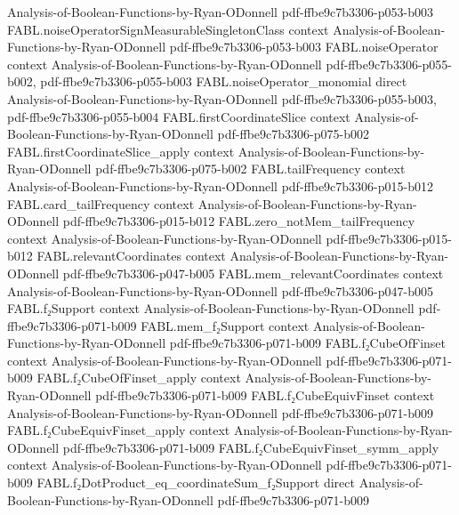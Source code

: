 \begin{theorem}
  {Analysis-of-Boolean-Functions-by-Ryan-ODonnell}
  {pdf-ffbe9c7b3306-p053-b003}
\proofstep
  {FABL.noiseOperatorSignMeasurableSingletonClass}
  {context}
  {Analysis-of-Boolean-Functions-by-Ryan-ODonnell}
  {pdf-ffbe9c7b3306-p053-b003}
\proofstep
  {FABL.noiseOperator}
  {context}
  {Analysis-of-Boolean-Functions-by-Ryan-ODonnell}
  {pdf-ffbe9c7b3306-p055-b002,
    pdf-ffbe9c7b3306-p055-b003}
\proofstep
  {FABL.noiseOperator_monomial}
  {direct}
  {Analysis-of-Boolean-Functions-by-Ryan-ODonnell}
  {pdf-ffbe9c7b3306-p055-b003,
    pdf-ffbe9c7b3306-p055-b004}
\proofstep
  {FABL.firstCoordinateSlice}
  {context}
  {Analysis-of-Boolean-Functions-by-Ryan-ODonnell}
  {pdf-ffbe9c7b3306-p075-b002}
\proofstep
  {FABL.firstCoordinateSlice_apply}
  {context}
  {Analysis-of-Boolean-Functions-by-Ryan-ODonnell}
  {pdf-ffbe9c7b3306-p075-b002}
\proofstep
  {FABL.tailFrequency}
  {context}
  {Analysis-of-Boolean-Functions-by-Ryan-ODonnell}
  {pdf-ffbe9c7b3306-p015-b012}
\proofstep
  {FABL.card_tailFrequency}
  {context}
  {Analysis-of-Boolean-Functions-by-Ryan-ODonnell}
  {pdf-ffbe9c7b3306-p015-b012}
\proofstep
  {FABL.zero_notMem_tailFrequency}
  {context}
  {Analysis-of-Boolean-Functions-by-Ryan-ODonnell}
  {pdf-ffbe9c7b3306-p015-b012}
\proofstep
  {FABL.relevantCoordinates}
  {context}
  {Analysis-of-Boolean-Functions-by-Ryan-ODonnell}
  {pdf-ffbe9c7b3306-p047-b005}
\proofstep
  {FABL.mem_relevantCoordinates}
  {context}
  {Analysis-of-Boolean-Functions-by-Ryan-ODonnell}
  {pdf-ffbe9c7b3306-p047-b005}
\proofstep
  {FABL.f₂Support}
  {context}
  {Analysis-of-Boolean-Functions-by-Ryan-ODonnell}
  {pdf-ffbe9c7b3306-p071-b009}
\proofstep
  {FABL.mem_f₂Support}
  {context}
  {Analysis-of-Boolean-Functions-by-Ryan-ODonnell}
  {pdf-ffbe9c7b3306-p071-b009}
\proofstep
  {FABL.f₂CubeOfFinset}
  {context}
  {Analysis-of-Boolean-Functions-by-Ryan-ODonnell}
  {pdf-ffbe9c7b3306-p071-b009}
\proofstep
  {FABL.f₂CubeOfFinset_apply}
  {context}
  {Analysis-of-Boolean-Functions-by-Ryan-ODonnell}
  {pdf-ffbe9c7b3306-p071-b009}
\proofstep
  {FABL.f₂CubeEquivFinset}
  {context}
  {Analysis-of-Boolean-Functions-by-Ryan-ODonnell}
  {pdf-ffbe9c7b3306-p071-b009}
\proofstep
  {FABL.f₂CubeEquivFinset_apply}
  {context}
  {Analysis-of-Boolean-Functions-by-Ryan-ODonnell}
  {pdf-ffbe9c7b3306-p071-b009}
\proofstep
  {FABL.f₂CubeEquivFinset_symm_apply}
  {context}
  {Analysis-of-Boolean-Functions-by-Ryan-ODonnell}
  {pdf-ffbe9c7b3306-p071-b009}
\proofstep
  {FABL.f₂DotProduct_eq_coordinateSum_f₂Support}
  {direct}
  {Analysis-of-Boolean-Functions-by-Ryan-ODonnell}
  {pdf-ffbe9c7b3306-p071-b009}
\proofstep

\end{theorem}

